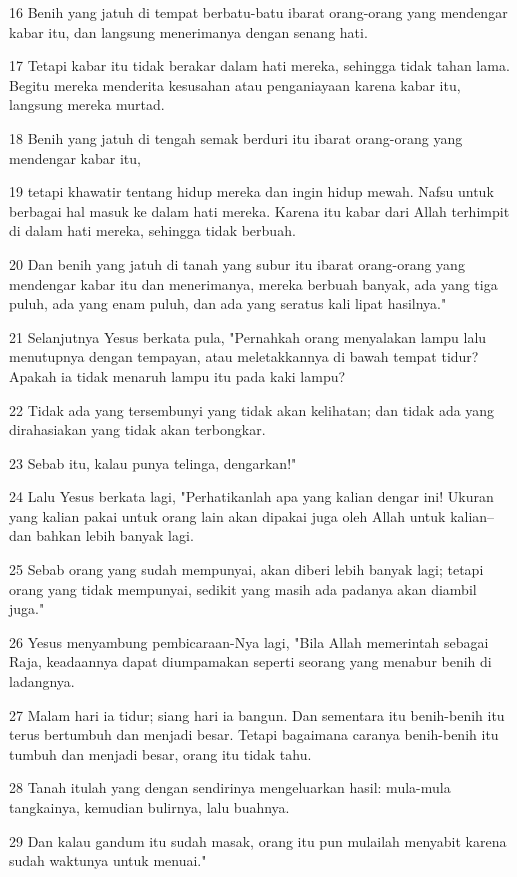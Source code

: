 \par 16 Benih yang jatuh di tempat berbatu-batu ibarat orang-orang yang mendengar kabar itu, dan langsung menerimanya dengan senang hati.
\par 17 Tetapi kabar itu tidak berakar dalam hati mereka, sehingga tidak tahan lama. Begitu mereka menderita kesusahan atau penganiayaan karena kabar itu, langsung mereka murtad.
\par 18 Benih yang jatuh di tengah semak berduri itu ibarat orang-orang yang mendengar kabar itu,
\par 19 tetapi khawatir tentang hidup mereka dan ingin hidup mewah. Nafsu untuk berbagai hal masuk ke dalam hati mereka. Karena itu kabar dari Allah terhimpit di dalam hati mereka, sehingga tidak berbuah.
\par 20 Dan benih yang jatuh di tanah yang subur itu ibarat orang-orang yang mendengar kabar itu dan menerimanya, mereka berbuah banyak, ada yang tiga puluh, ada yang enam puluh, dan ada yang seratus kali lipat hasilnya."
\par 21 Selanjutnya Yesus berkata pula, "Pernahkah orang menyalakan lampu lalu menutupnya dengan tempayan, atau meletakkannya di bawah tempat tidur? Apakah ia tidak menaruh lampu itu pada kaki lampu?
\par 22 Tidak ada yang tersembunyi yang tidak akan kelihatan; dan tidak ada yang dirahasiakan yang tidak akan terbongkar.
\par 23 Sebab itu, kalau punya telinga, dengarkan!"
\par 24 Lalu Yesus berkata lagi, "Perhatikanlah apa yang kalian dengar ini! Ukuran yang kalian pakai untuk orang lain akan dipakai juga oleh Allah untuk kalian--dan bahkan lebih banyak lagi.
\par 25 Sebab orang yang sudah mempunyai, akan diberi lebih banyak lagi; tetapi orang yang tidak mempunyai, sedikit yang masih ada padanya akan diambil juga."
\par 26 Yesus menyambung pembicaraan-Nya lagi, "Bila Allah memerintah sebagai Raja, keadaannya dapat diumpamakan seperti seorang yang menabur benih di ladangnya.
\par 27 Malam hari ia tidur; siang hari ia bangun. Dan sementara itu benih-benih itu terus bertumbuh dan menjadi besar. Tetapi bagaimana caranya benih-benih itu tumbuh dan menjadi besar, orang itu tidak tahu.
\par 28 Tanah itulah yang dengan sendirinya mengeluarkan hasil: mula-mula tangkainya, kemudian bulirnya, lalu buahnya.
\par 29 Dan kalau gandum itu sudah masak, orang itu pun mulailah menyabit karena sudah waktunya untuk menuai."
